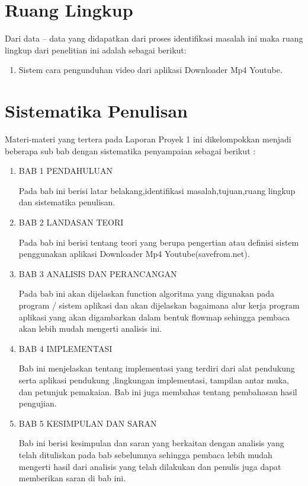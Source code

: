 \section{Ruang Lingkup}
Dari data – data yang didapatkan dari proses identifikasi masalah ini maka ruang lingkup dari penelitian ini adalah sebagai berikut:
\begin{enumerate}
\item Sistem cara pengunduhan video dari aplikasi Downloader Mp4 Youtube.
\end{enumerate}

\section{Sistematika Penulisan}
Materi-materi yang tertera pada Laporan Proyek 1 ini dikelompokkan menjadi beberapa sub bab dengan sistematika penyampaian sebagai berikut :
\begin{enumerate}
    \item BAB 1 PENDAHULUAN
    \par
    Pada bab ini berisi latar belakang,identiﬁkasi masalah,tujuan,ruang lingkup dan sistematika penulisan.
    
    \item BAB 2 LANDASAN TEORI
    \par
    Pada bab ini berisi tentang teori yang berupa pengertian atau deﬁnisi sistem penggunakan aplikasi Downloader Mp4 Youtube(savefrom.net).
    
    \item  BAB 3 ANALISIS DAN PERANCANGAN
    \par
    Pada bab ini akan dijelaskan function algoritma yang digunakan pada program / sistem aplikasi dan akan dijelaskan bagaimana alur kerja program aplikasi yang akan digambarkan dalam bentuk ﬂowmap sehingga pembaca akan lebih mudah mengerti analisis ini.
    
    \item BAB 4 IMPLEMENTASI
    \par
    Bab ini menjelaskan tentang implementasi yang terdiri dari alat pendukung serta aplikasi pendukung ,lingkungan implementasi, tampilan antar muka, dan petunjuk pemakaian. Bab ini juga membahas tentang pembahasan hasil pengujian.
    
    \item BAB 5 KESIMPULAN DAN SARAN
    \par
    Bab ini berisi kesimpulan dan saran yang berkaitan dengan analisis yang telah dituliskan pada bab sebelumnya sehingga pembaca lebih mudah mengerti hasil dari analisis yang telah dilakukan dan penulis juga dapat memberikan saran di bab ini.

\end{enumerate}